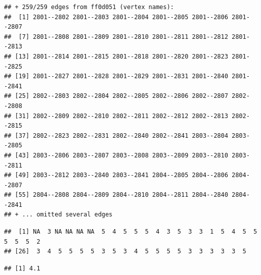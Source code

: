 \documentclass[
]{book}
\newenvironment{Shaded}{\begin{snugshade}}{\end{snugshade}}
\newcommand{\AttributeTok}[1]{\textcolor[rgb]{0.13,0.29,0.53}{#1}}
\newcommand{\CommentTok}[1]{\textcolor[rgb]{0.56,0.35,0.01}{\textit{#1}}}
\newcommand{\ConstantTok}[1]{\textcolor[rgb]{0.56,0.35,0.01}{#1}}
\newcommand{\FunctionTok}[1]{\textcolor[rgb]{0.13,0.29,0.53}{\textbf{#1}}}
\newcommand{\NormalTok}[1]{#1}
\newcommand{\SpecialCharTok}[1]{\textcolor[rgb]{0.81,0.36,0.00}{\textbf{#1}}}
\begin{document}
\begin{verbatim}
## + 259/259 edges from ff0d051 (vertex names):
##  [1] 2801--2802 2801--2803 2801--2804 2801--2805 2801--2806 2801--2807
##  [7] 2801--2808 2801--2809 2801--2810 2801--2811 2801--2812 2801--2813
## [13] 2801--2814 2801--2815 2801--2818 2801--2820 2801--2823 2801--2825
## [19] 2801--2827 2801--2828 2801--2829 2801--2831 2801--2840 2801--2841
## [25] 2802--2803 2802--2804 2802--2805 2802--2806 2802--2807 2802--2808
## [31] 2802--2809 2802--2810 2802--2811 2802--2812 2802--2813 2802--2815
## [37] 2802--2823 2802--2831 2802--2840 2802--2841 2803--2804 2803--2805
## [43] 2803--2806 2803--2807 2803--2808 2803--2809 2803--2810 2803--2811
## [49] 2803--2812 2803--2840 2803--2841 2804--2805 2804--2806 2804--2807
## [55] 2804--2808 2804--2809 2804--2810 2804--2811 2804--2840 2804--2841
## + ... omitted several edges
\end{verbatim}

\begin{Shaded}
\end{Shaded}

\begin{verbatim}
##  [1] NA  3 NA NA NA NA  5  4  5  5  5  4  3  5  3  3  1  5  4  5  5  5  5  5  2
## [26]  3  4  5  5  5  5  3  5  3  4  5  5  5  5  3  3  3  3  3  5
\end{verbatim}

\begin{Shaded}
\end{Shaded}

\begin{verbatim}
## [1] 4.1
\end{verbatim}

\begin{Shaded}
\end{Shaded}
\end{document}

